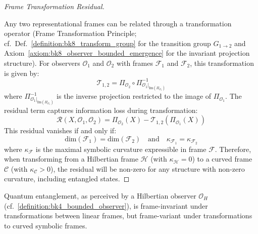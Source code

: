 \begin{proof}[Frame Transformation Residual]
\label{proof:bk8_frame_transformation_residual}
\leavevmode

Any two representational frames can be related through a transformation operator (Frame Transformation Principle; cf.~Def.~\ref{definition:bk8_transform_group} for the transition group $G_{1\to2}$ and Axiom~\ref{axiom:bk8_observer_bounded_emergence} for the invariant projection structure). For observers $\mathcal{O}_1$ and $\mathcal{O}_2$ with frames $\mathcal{F}_1$ and $\mathcal{F}_2$, this transformation is given by:
\begin{equation}
\mathcal{T}_{1,2} = \Pi_{\mathcal{O}_2} \circ \Pi^{-1}_{\mathcal{O}_1|_{\text{Im}(\Pi_{\mathcal{O}_1})}}
\end{equation}
where $\Pi^{-1}_{\mathcal{O}_1|_{\text{Im}(\Pi_{\mathcal{O}_1})}}$ is the inverse projection restricted to the image of $\Pi_{\mathcal{O}_1}$.
The residual term captures information loss during transformation:
\begin{equation}
\mathcal{R}(X, \mathcal{O}_1, \mathcal{O}_2) = \Pi_{\mathcal{O}_2}(X) - \mathcal{T}_{1,2}(\Pi_{\mathcal{O}_1}(X))
\end{equation}
This residual vanishes if and only if:
\begin{equation}
\text{dim}(\mathcal{F}_1) = \text{dim}(\mathcal{F}_2) \quad \text{and} \quad \kappa_{\mathcal{F}_1} = \kappa_{\mathcal{F}_2}
\end{equation}
where $\kappa_{\mathcal{F}}$ is the maximal symbolic curvature expressible in frame $\mathcal{F}$.
Therefore, when transforming from a Hilbertian frame $\mathcal{H}$ (with $\kappa_{\mathcal{H}} = 0$) to a curved frame $\mathcal{C}$ (with $\kappa_{\mathcal{C}} > 0$), the residual will be non-zero for any structure with non-zero curvature, including entangled states.
\end{proof}
\begin{corollary}
\label{corollary:bk8_entanglement_frame_invariance}
Quantum entanglement, as perceived by a Hilbertian observer $\mathcal{O}_H$ (cf.~\ref{definition:bk4_bounded_observer}), is frame-invariant under transformations between linear frames, but frame-variant under transformations to curved symbolic frames.
\end{corollary}
